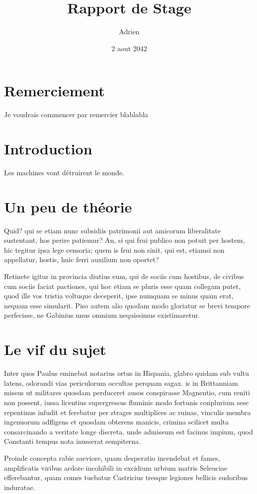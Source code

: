 \documentclass{report}
\title{Rapport de Stage}
\author{Adrien \bsc{Sanchez}}
\date{2 aout 2042}
\begin{document}
\maketitle

\chapter*{Remerciement}
Je voudrais commencer par remercier blablabla

\chapter*{Introduction}
Les machines vont détruirent le monde.

\chapter{Un peu de théorie}
Quid? qui se etiam nunc subsidiis patrimonii aut amicorum liberalitate sustentant,
hos perire patiemur? An, si qui frui publico non potuit per hostem, hic tegitur ipsa
lege censoria; quem is frui non sinit, qui est, etiamsi non appellatur, hostis, huic
ferri auxilium non oportet?

Retinete igitur in provincia diutius eum, qui de sociis
cum hostibus, de civibus cum sociis faciat pactiones, qui hoc etiam se pluris esse
quam collegam putet, quod ille vos tristia voltuque deceperit, ipse numquam se minus
quam erat, nequam esse simularit. Piso autem alio quodam modo gloriatur se brevi
tempore perfecisse,
ne Gabinius unus omnium nequissimus existimaretur.

\chapter{Le vif du sujet}


Inter quos Paulus eminebat notarius ortus in Hispania, glabro quidam sub vultu latens, odorandi vias periculorum occultas perquam sagax. is in Brittanniam missus ut militares quosdam perduceret ausos conspirasse Magnentio, cum reniti non possent, iussa licentius supergressus fluminis modo fortunis conplurium sese repentinus infudit et ferebatur per strages multiplices ac ruinas, vinculis membra ingenuorum adfligens et quosdam obterens manicis, crimina scilicet multa consarcinando a veritate longe discreta. unde admissum est facinus impium, quod Constanti tempus nota inusserat sempiterna.

Proinde concepta rabie saeviore, quam desperatio incendebat et fames, amplificatis viribus ardore incohibili in excidium urbium matris Seleuciae efferebantur, quam comes tuebatur Castricius tresque legiones bellicis sudoribus induratae.
\end{document}
